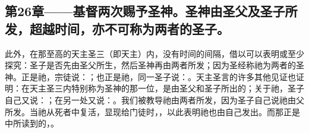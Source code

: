
\subsection{第26章——基督两次赐予圣神。圣神由圣父及圣子所发，超越时间，亦不可称为两者的圣子。}

此外，在那至高的天主圣三（即天主）内，没有时间的间隔，借以可以表明或至少探究：圣子是否先由圣父所生，然后圣神再由两者所发；因为圣经称祂为两者的圣神。正是祂，宗徒说：；也正是祂，同一圣子说：。天主圣言的许多其他见证也证明：在天主圣三内特别称为圣神的那一位，是由圣父和圣子所出的；关于祂，圣子自己又说：；在另一处又说：。我们被教导祂由两者所发，因为圣子自己说祂由父所发。当祂从死者中复活，显现给门徒时，，以此表明祂也由自己发出。而那正是中所读到的，。\par

